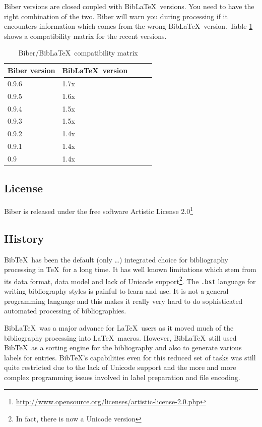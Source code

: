 \documentclass{ltxdockit}
\begin{document}
Biber versions are closed coupled with Bib\LaTeX\ versions. You
need to have the right combination of the two. Biber will warn you
during processing if it encounters information which comes from the wrong
Bib\LaTeX\ version. Table \ref{tab:compat} shows a compatibility
matrix for the recent versions.

\begin{table}
\begin{center}
\small
\begin{tabular}{lllll}
\toprule
Biber version & Bib\LaTeX\ version\\
\midrule
0.9.6 & 1.7x\\
0.9.5 & 1.6x\\
0.9.4 & 1.5x\\
0.9.3 & 1.5x\\
0.9.2 & 1.4x\\
0.9.1 & 1.4x\\
0.9 & 1.4x\\
\bottomrule
\end{tabular}
\end{center}
\caption{Biber/Bib\LaTeX\ compatibility matrix}
\label{tab:compat}
\end{table}

\subsection{License}

Biber is released under the free software Artistic License 2.0\footnote{\url{http://www.opensource.org/licenses/artistic-license-2.0.php}}

\subsection{History}

Bib\TeX\ has been the default (only \ldots) integrated choice for
bibliography processing in \TeX\ for a long time. It has well known
limitations which stem from its data format, data model and lack of Unicode
support\footnote{In fact, there is now a Unicode version}. The
\verb+.bst+ language for writing bibliography styles is painful to learn
and use. It is not a general programming language and this makes it really
very hard to do sophisticated automated processing of bibliographies.

Bib\LaTeX\ was a major advance for \LaTeX\ users as it moved much
of the bibliography processing into \LaTeX\ macros. However,
Bib\LaTeX\ still used Bib\TeX\ as a sorting engine for the
bibliography and also to generate various labels for
entries. Bib\TeX's capabilities even for this reduced set of
tasks was still quite restricted due to the lack of Unicode support and
the more and more complex programming issues involved in label
preparation and file encoding.
\end{document}
